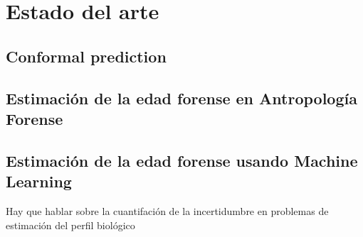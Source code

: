 \chapter{Estado del arte}

\section{Conformal prediction}



\section{Estimación de la edad forense en Antropología Forense}



\section{Estimación de la edad forense usando Machine Learning}

Hay que hablar sobre la cuantifación de la incertidumbre en problemas de estimación del perfil biológico


